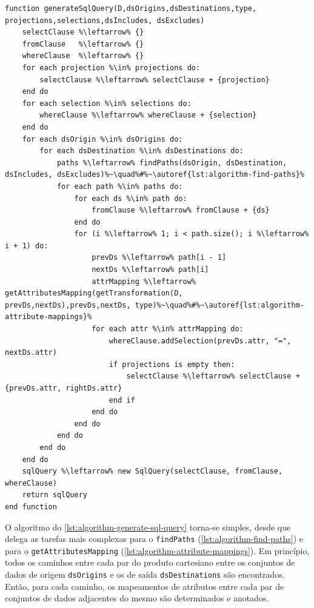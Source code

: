\begin{minipage}[c]{0.95\textwidth}
\begin{lstlisting}[language=pseudocode,label={lst:algorithm-generate-sql-query},caption={[Geração da consulta em SQL]Geração da consulta na linguagem SQL a partir das especificações do usuário.}]
function generateSqlQuery(D,dsOrigins,dsDestinations,type,
projections,selections,dsIncludes, dsExcludes)
    selectClause %\leftarrow% {}
    fromClause   %\leftarrow% {}
    whereClause  %\leftarrow% {}
    for each projection %\in% projections do:
        selectClause %\leftarrow% selectClause + {projection}
    end do
    for each selection %\in% selections do:
        whereClause %\leftarrow% whereClause + {selection}
    end do
    for each dsOrigin %\in% dsOrigins do:
        for each dsDestination %\in% dsDestinations do:
            paths %\leftarrow% findPaths(dsOrigin, dsDestination, dsIncludes, dsExcludes)%~\quad%#%~\autoref{lst:algorithm-find-paths}%
            for each path %\in% paths do:
                for each ds %\in% path do:
                    fromClause %\leftarrow% fromClause + {ds}
                end do                
                for (i %\leftarrow% 1; i < path.size(); i %\leftarrow% i + 1) do:
                    prevDs %\leftarrow% path[i - 1]
                    nextDs %\leftarrow% path[i]
                    attrMapping %\leftarrow% getAttributesMapping(getTransformation(D, prevDs,nextDs),prevDs,nextDs, type)%~\quad%#%~\autoref{lst:algorithm-attribute-mappings}%
                    for each attr %\in% attrMapping do:
                        whereClause.addSelection(prevDs.attr, "=", nextDs.attr)
                        if projections is empty then:
                            selectClause %\leftarrow% selectClause + {prevDs.attr, rightDs.attr}
                        end if
                    end do
                end do
            end do
        end do
    end do
    sqlQuery %\leftarrow% new SqlQuery(selectClause, fromClause, whereClause)
    return sqlQuery
end function
\end{lstlisting}
\end{minipage}

O algoritmo do \autoref{lst:algorithm-generate-sql-query} torna-se simples, desde que delega as tarefas mais complexas para o \texttt{findPaths} (\autoref{lst:algorithm-find-paths}) e para o \texttt{getAttributesMapping} (\autoref{lst:algorithm-attribute-mappings}). Em princípio, todos os caminhos entre cada par do produto cartesiano entre os conjuntos de dados de origem \texttt{dsOrigins} e os de saída \texttt{dsDestinations} são encontrados. Então, para cada caminho, os mapeamentos de atributos entre cada par de conjuntos de dados adjacentes do mesmo são determinados e anotados.

